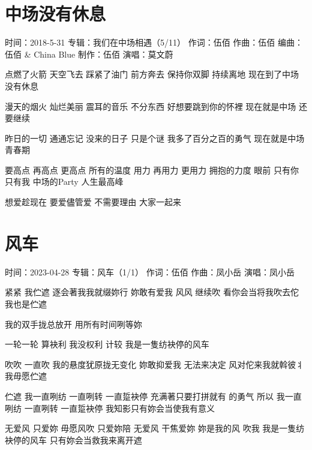 \documentclass[UTF8,a4paper,oneside,twocolumn,12pt]{ctexbook}
\newcommand{\infopair}[2]{\textbullet #1：#2}
\newcommand{\zc}[1][伍佰]{\infopair{作词}{#1}}
\newcommand{\zq}[1][伍佰]{\infopair{作曲}{#1}}
\newcommand{\bq}[1][伍佰]{\infopair{编曲}{#1}}
\newcommand{\zj}[1]{\infopair{专辑}{#1}}
\newcommand{\zz}[1]{\infopair{制作}{#1}}
\newcommand{\sj}[1]{\infopair{时间}{#1}}
\newenvironment{info}{\begin{flushleft}\kaishu
	}
	{\end{flushleft}\normalsize\yahei\par}
\newenvironment{lyric}{
	}
{}
\begin{document}
\section{中场没有休息}
\begin{info}
	\sj{2018-5-31}
	\zj{我们在中场相遇（5/11）}
	\zc
	\zq
	\bq[伍佰 \& China Blue]
	\zz{伍佰}
	\infopair{演唱}{莫文蔚}
\end{info}
\begin{lyric}
	点燃了火箭 天空飞去
	踩紧了油门 前方奔去
	保持你双脚 持续离地
	现在到了中场 没有休息

	漫天的烟火 灿烂美丽
	震耳的音乐 不分东西
	好想要跳到你的怀裡
	现在就是中场 还要继续

	昨日的一切 通通忘记
	没来的日子 只是个谜
	我多了百分之百的勇气
	现在就是中场青春期

	要高点 再高点 更高点 所有的温度
	用力 再用力 更用力 拥抱的力度
	眼前 只有你 只有我 中场的Party
	人生最高峰

	想爱趁现在 要爱儘管爱
	不需要理由 大家一起来
\end{lyric}

\section{风车}
\begin{info}
	\sj{2023-04-28}
	\zj{风车（1/1）}
	\zc
	\zq[凤小岳]
	\infopair{演唱}{凤小岳}
\end{info}
\begin{lyric}
	紧紧 我伫遮
	逐会著我我就缀妳行
	妳敢有爱我
	风风 继续吹
	看你会当将我吹去佗
	我也是伫遮

	我的双手拢总放开
	用所有时间咧等妳

	一轮一轮 算袂利
	我没权利 计较
	我是一隻纺袂停的风车

	吹吹 一直吹
	我的悬度犹原拢无变化
	妳敢抑爱我
	无法来决定
	风对佗来我就斡彼丬
	我毋愿伫遮

	伫遮 我一直咧纺 一直咧转 一直踅袂停
	充满著只要打拼就有 的勇气
	所以 我一直咧纺 一直咧转 一直踅袂停
	我知影只有妳会当使我有意义

	无爱风 只爱妳 毋愿风吹 只爱妳陪 无爱风 干焦爱妳 妳是我的风 吹我
	我是一隻纺袂停的风车 只有妳会当救我来离开遮
\end{lyric}
\end{document}
